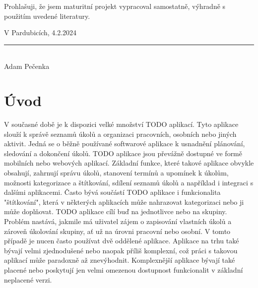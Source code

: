 \documentclass[a4paper,12pt]{report}
\begin{document}

\pagebreak
\vspace*{\fill}
Prohlašuji, že jsem maturitní projekt vypracoval samostatně, výhradně s použitím uvedené literatury.

\noindent \parbox{\textwidth}{
        \noindent V Pardubicích, 4.2.2024
        \hfill\parbox{5cm}{
            \centering
            \vspace{9mm}
            \rule{5cm}{1pt}\\
            Adam Pečenka
        }
}

\pagebreak
\renewcommand{\contentsname}{\centering Obsah}
\tableofcontents
\pagebreak

\setcounter{page}{1}
\setcounter{section}{1}
\chapter{Úvod}
V současné době je k dispozici velké množství TODO aplikací. Tyto aplikace slouží k správě seznamů úkolů a organizaci pracovních, osobních nebo jiných aktivit. Jedná se o běžně používané softwarové aplikace k usnadnění plánování, sledování a dokončení úkolů. TODO aplikace jsou převážně dostupné ve formě mobilních nebo webových aplikací.
\newline
Základní funkce, které takové aplikace obvykle obsahují, zahrnují správu úkolů, stanovení termínů a upomínek k úkolům, možnosti kategorizace a štítkování, sdílení seznamů úkolů a například i integraci s dalšími aplikacemi. Často bývá součástí TODO aplikace i funkcionalita "štítkování", která v některých aplikacích může nahrazovat kategorizaci nebo ji může doplňovat.
\newline
TODO aplikace cílí buď na jednotlivce nebo na skupiny. Problém nastává, jakmile má uživatel zájem o zapisování  vlastních úkolů a zároveň úkolování skupiny, ať už na úrovni pracovní nebo osobní. V tomto případě je nucen často používat dvě oddělené aplikace. Aplikace na trhu také bývají velmi zjednodušené nebo naopak příliš komplexní, což práci s takovou aplikací může paradoxně až znevýhodnit. Komplexnější aplikace bývají také placené nebo poskytují jen velmi omezenou dostupnost funkcionalit v základní neplacené verzi.
\newline
\end{document}
